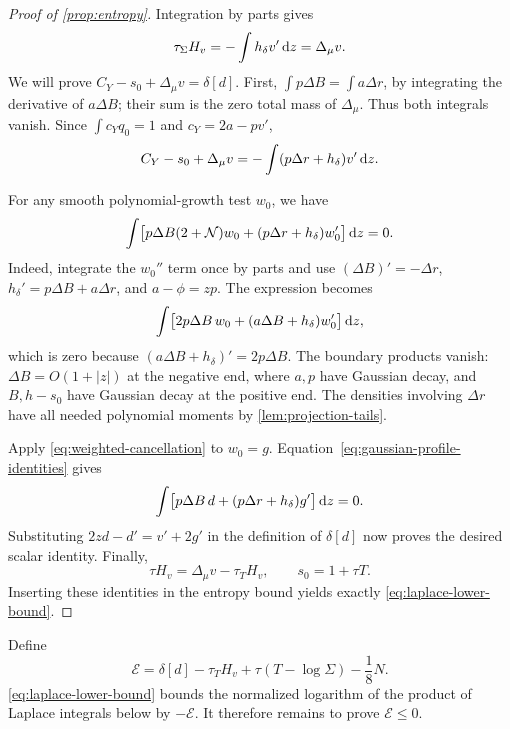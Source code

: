 \begin{proof}[Proof of \cref{prop:entropy}]
Integration by parts gives
\[
\tau_\Sigma H_v=-\int h_\delta v'\,\mathrm{d} z=\Delta_\mu v.
\]
We will prove $C_Y-s_0+\Delta_\mu v=\delta[d]$. First, $\int p\Delta B=\int a\Delta r$, by integrating the derivative of $a\Delta B$; their sum is the zero total mass of $\Delta_\mu$. Thus both integrals vanish. Since $\int c_Yq_0=1$ and $c_Y=2a-pv'$,
\[
C_Y-s_0+\Delta_\mu v=-\int(p\Delta r+h_\delta)v'\,\mathrm{d} z.
\]

For any smooth polynomial-growth test $w_0$, we have
\begin{equation}
\int\bigl[p\Delta B(2+\mathcal{N})w_0
 +(p\Delta r+h_\delta)w_0'\bigr]\,\mathrm{d} z=0.
\label{eq:weighted-cancellation}
\end{equation}
Indeed, integrate the $w_0''$ term once by parts and use $(\Delta B)'=-\Delta r$, $h_\delta'=p\Delta B+a\Delta r$, and $a-\phi=zp$. The expression becomes
\[
\int\bigl[2p\Delta B\,w_0+(a\Delta B+h_\delta)w_0'\bigr]\,\mathrm{d} z,
\]
which is zero because $(a\Delta B+h_\delta)'=2p\Delta B$. The boundary products vanish: $\Delta B=O(1+|z|)$ at the negative end, where $a,p$ have Gaussian decay, and $B,h-s_0$ have Gaussian decay at the positive end. The densities involving $\Delta r$ have all needed polynomial moments by \cref{lem:projection-tails}.

Apply \eqref{eq:weighted-cancellation} to $w_0=g$. Equation~\eqref{eq:gaussian-profile-identities} gives
\[
\int\bigl[p\Delta B\,d+(p\Delta r+h_\delta)g'\bigr]\,\mathrm{d} z=0.
\]
Substituting $2zd-d'=v'+2g'$ in the definition of $\delta[d]$ now proves the desired scalar identity. Finally,
\[
\tau H_v=\Delta_\mu v-\tau_T H_v,\qquad s_0=1+\tau T.
\]
Inserting these identities in the entropy bound yields exactly \eqref{eq:laplace-lower-bound}.
\end{proof}

Define
\[
 \mathcal{E}=\delta[d]-\tau_T H_v+\tau(T-\log\Sigma)-\frac18N.
\]
\eqref{eq:laplace-lower-bound} bounds the normalized logarithm of the product of Laplace integrals below by $-\mathcal{E}$. It therefore remains to prove $\mathcal{E}\le0$.
